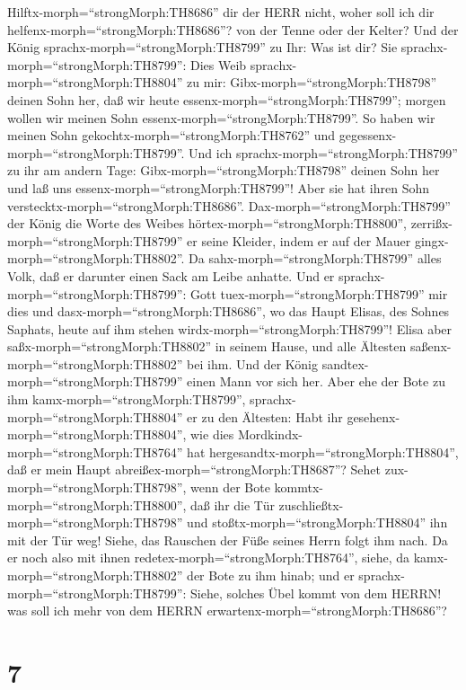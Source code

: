 Hilftx-morph=``strongMorph:TH8686'' dir der HERR nicht, woher soll ich
dir helfenx-morph=``strongMorph:TH8686''? von der Tenne oder der Kelter?
 Und der König sprachx-morph=``strongMorph:TH8799'' zu Ihr:
Was ist dir? Sie sprachx-morph=``strongMorph:TH8799'': Dies Weib
sprachx-morph=``strongMorph:TH8804'' zu mir:
Gibx-morph=``strongMorph:TH8798'' deinen Sohn her, daß wir heute
essenx-morph=``strongMorph:TH8799''; morgen wollen wir meinen Sohn
essenx-morph=``strongMorph:TH8799''.  So haben wir meinen
Sohn gekochtx-morph=``strongMorph:TH8762'' und
gegessenx-morph=``strongMorph:TH8799''. Und ich
sprachx-morph=``strongMorph:TH8799'' zu ihr am andern Tage:
Gibx-morph=``strongMorph:TH8798'' deinen Sohn her und laß uns
essenx-morph=``strongMorph:TH8799''! Aber sie hat ihren Sohn
verstecktx-morph=``strongMorph:TH8686''. 
Dax-morph=``strongMorph:TH8799'' der König die Worte des Weibes
hörtex-morph=``strongMorph:TH8800'',
zerrißx-morph=``strongMorph:TH8799'' er seine Kleider, indem er auf der
Mauer gingx-morph=``strongMorph:TH8802''. Da
sahx-morph=``strongMorph:TH8799'' alles Volk, daß er darunter einen Sack
am Leibe anhatte.  Und er
sprachx-morph=``strongMorph:TH8799'': Gott
tuex-morph=``strongMorph:TH8799'' mir dies und
dasx-morph=``strongMorph:TH8686'', wo das Haupt Elisas, des Sohnes
Saphats, heute auf ihm stehen wirdx-morph=``strongMorph:TH8799''!
 Elisa aber saßx-morph=``strongMorph:TH8802'' in seinem
Hause, und alle Ältesten saßenx-morph=``strongMorph:TH8802'' bei ihm.
Und der König sandtex-morph=``strongMorph:TH8799'' einen Mann vor sich
her. Aber ehe der Bote zu ihm kamx-morph=``strongMorph:TH8799'',
sprachx-morph=``strongMorph:TH8804'' er zu den Ältesten: Habt ihr
gesehenx-morph=``strongMorph:TH8804'', wie dies
Mordkindx-morph=``strongMorph:TH8764'' hat
hergesandtx-morph=``strongMorph:TH8804'', daß er mein Haupt
abreißex-morph=``strongMorph:TH8687''? Sehet
zux-morph=``strongMorph:TH8798'', wenn der Bote
kommtx-morph=``strongMorph:TH8800'', daß ihr die Tür
zuschließtx-morph=``strongMorph:TH8798'' und
stoßtx-morph=``strongMorph:TH8804'' ihn mit der Tür weg! Siehe, das
Rauschen der Füße seines Herrn folgt ihm nach.  Da er noch
also mit ihnen redetex-morph=``strongMorph:TH8764'', siehe, da
kamx-morph=``strongMorph:TH8802'' der Bote zu ihm hinab; und er
sprachx-morph=``strongMorph:TH8799'': Siehe, solches Übel kommt von dem
HERRN! was soll ich mehr von dem HERRN
erwartenx-morph=``strongMorph:TH8686''?

\hypertarget{section-6}{%
\section{7}\label{section-6}}

